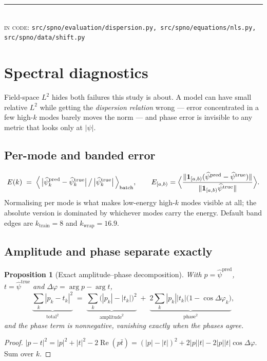 \documentclass[11pt,a4paper]{article}
\theoremstyle{plain}
\newtheorem{proposition}[theorem]{Proposition}
\theoremstyle{definition}
\theoremstyle{remark}
\newcommand{\kwrap}{k_{\mathrm{wrap}}}
\newcommand{\ktrain}{k_{\mathrm{train}}}
\newcommand{\src}[1]{{\color{linknavy}\texttt{\footnotesize #1}}}
\DeclareMathOperator{\Real}{Re}
\newcommand{\sourcenote}[1]{%
  \par\vspace{0.35em}\noindent
  {\footnotesize\color{rulegray}\rule{\linewidth}{0.4pt}\\[0.25em]
  \textsc{in code:} \src{#1}}\par\vspace{0.5em}}
\begin{document}
\sourcenote{src/spno/evaluation/dispersion.py, src/spno/equations/nls.py, src/spno/data/shift.py}

\section{Spectral diagnostics}
\label{sec:spectraldiag}

Field-space $L^2$ hides both failures this study is about. A model can have small relative
$L^2$ while getting the \emph{dispersion relation} wrong --- error concentrated in a few
high-$k$ modes barely moves the norm --- and phase error is invisible to any metric that
looks only at $|\psi|$.

\subsection{Per-mode and banded error}

\[
E(k) \;=\; \Bigl\langle\, \bigl|\widehat{\psi}^{\mathrm{pred}}_k - \widehat{\psi}^{\mathrm{true}}_k\bigr| \,\big/\, \bigl|\widehat{\psi}^{\mathrm{true}}_k\bigr| \,\Bigr\rangle_{\text{batch}},
\qquad
E_{[a,b)} = \Bigl\langle \frac{\|\mathbf{1}_{[a,b)}(\widehat{\psi}^{\mathrm{pred}}-\widehat{\psi}^{\mathrm{true}})\|}{\|\mathbf{1}_{[a,b)}\widehat{\psi}^{\mathrm{true}}\|}\Bigr\rangle .
\]
Normalising per mode is what makes low-energy high-$k$ modes visible at all; the absolute
version is dominated by whichever modes carry the energy. Default band edges are
$\ktrain=8$ and $\kwrap=16.9$.

\subsection{Amplitude and phase separate exactly}

\begin{proposition}[Exact amplitude--phase decomposition]
\label{prop:ampphase}
With $p = \widehat\psi^{\mathrm{pred}}$, $t = \widehat\psi^{\mathrm{true}}$ and
$\Delta\varphi = \arg p - \arg t$,
\[
\underbrace{\sum_k|p_k-t_k|^2}_{\text{total}^2}
\;=\;
\underbrace{\sum_k\bigl(|p_k|-|t_k|\bigr)^2}_{\text{amplitude}^2}
\;+\;
\underbrace{2\sum_k |p_k||t_k|\bigl(1-\cos\Delta\varphi_k\bigr)}_{\text{phase}^2},
\]
and the phase term is nonnegative, vanishing exactly when the phases agree.
\end{proposition}

\begin{proof}
$|p-t|^2 = |p|^2+|t|^2-2\Real(p\bar t) = (|p|-|t|)^2 + 2|p||t| - 2|p||t|\cos\Delta\varphi$.
Sum over $k$.
\end{proof}
\end{document}
